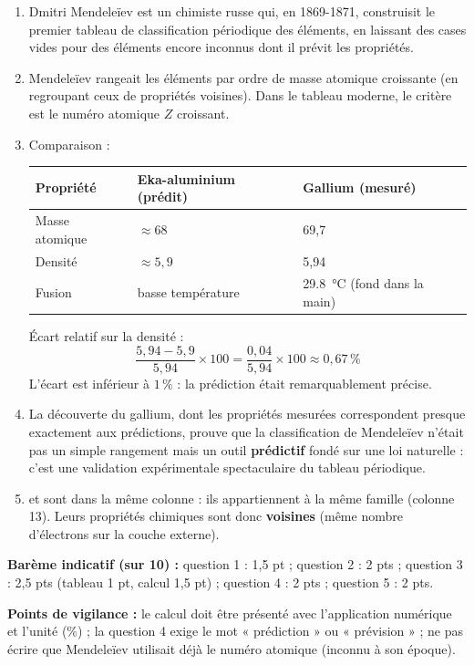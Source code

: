 \documentclass[11pt]{article}
\newcommand{\cle}[1]{{\popxbold\color{popdark}#1}}
\begin{document}
\begin{corrige}
\begin{enumerate}
\item Dmitri Mendeleïev est un chimiste russe qui, en 1869-1871, construisit le premier \cle{tableau de classification périodique} des éléments, en laissant des cases vides pour des éléments encore inconnus dont il prévit les propriétés.
\item Mendeleïev rangeait les éléments par ordre de \cle{masse atomique croissante} (en regroupant ceux de propriétés voisines). Dans le tableau moderne, le critère est le \cle{numéro atomique $Z$ croissant}.
\item Comparaison :
\begin{center}
\begin{tabularx}{\linewidth}{|l|X|X|}\hline
\rowcolor{popblueL} \textbf{Propriété} & \textbf{Eka-aluminium (prédit)} & \textbf{Gallium (mesuré)} \\ \hline
Masse atomique & $\approx 68$ & 69,7 \\ \hline
Densité & $\approx 5,9$ & 5,94 \\ \hline
Fusion & basse température & \SI{29,8}{\degreeCelsius} (fond dans la main) \\ \hline
\end{tabularx}
\end{center}
Écart relatif sur la densité :
\[ \frac{5,94 - 5,9}{5,94} \times 100 = \frac{0,04}{5,94} \times 100 \approx 0,67\,\% \]
L'écart est inférieur à $1\,\%$ : la prédiction était remarquablement précise.
\item La découverte du gallium, dont les propriétés mesurées correspondent presque exactement aux prédictions, prouve que la classification de Mendeleïev n'était pas un simple rangement mais un outil \textbf{prédictif} fondé sur une loi naturelle : c'est une validation expérimentale spectaculaire du tableau périodique.
\item {} et  sont dans la même colonne : ils appartiennent à la même \cle{famille} (colonne 13). Leurs propriétés chimiques sont donc \textbf{voisines} (même nombre d'électrons sur la couche externe).
\end{enumerate}
\textbf{Barème indicatif (sur 10) :} question 1 : 1,5 pt ; question 2 : 2 pts ; question 3 : 2,5 pts (tableau 1 pt, calcul 1,5 pt) ; question 4 : 2 pts ; question 5 : 2 pts.

\textbf{Points de vigilance :} le calcul doit être présenté avec l'application numérique et l'unité (\%) ; la question 4 exige le mot « prédiction » ou « prévision » ; ne pas écrire que Mendeleïev utilisait déjà le numéro atomique (inconnu à son époque).
\end{corrige}
\end{document}
